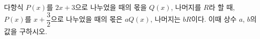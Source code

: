 다항식 $P(x)$를 $2x+3$으로 나누었을 때의 몫을 $Q(x)$, 나머지를 $R$라 할 때, $P(x)$를 $x+\dfrac{3}{2}$으로 나누었을 때의 몫은 $aQ(x)$, 나머지는 $bR$이다. 이때 상수 $a$, $b$의 값을 구하시오.
